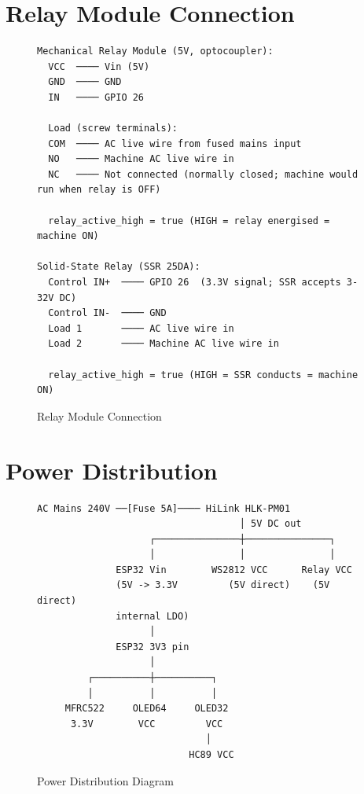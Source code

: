 \section{Relay Module Connection}

\begin{figure}[H]
\centering
\begin{verbatim}
Mechanical Relay Module (5V, optocoupler):
  VCC  ──── Vin (5V)
  GND  ──── GND
  IN   ──── GPIO 26

  Load (screw terminals):
  COM  ──── AC live wire from fused mains input
  NO   ──── Machine AC live wire in
  NC   ──── Not connected (normally closed; machine would run when relay is OFF)

  relay_active_high = true (HIGH = relay energised = machine ON)

Solid-State Relay (SSR 25DA):
  Control IN+  ──── GPIO 26  (3.3V signal; SSR accepts 3-32V DC)
  Control IN-  ──── GND
  Load 1       ──── AC live wire in
  Load 2       ──── Machine AC live wire in

  relay_active_high = true (HIGH = SSR conducts = machine ON)
\end{verbatim}
\caption{Relay Module Connection}
\label{fig:wiring_relay}
\end{figure}

\section{Power Distribution}

\begin{figure}[H]
\centering
\begin{verbatim}
AC Mains 240V ──[Fuse 5A]──── HiLink HLK-PM01
                                    │ 5V DC out
                    ┌───────────────┼───────────────┐
                    │               │               │
              ESP32 Vin        WS2812 VCC      Relay VCC
              (5V -> 3.3V         (5V direct)    (5V direct)
              internal LDO)
                    │
              ESP32 3V3 pin
                    │
         ┌──────────┼──────────┐
         │          │          │
     MFRC522     OLED64     OLED32
      3.3V        VCC         VCC
                              │
                           HC89 VCC
\end{verbatim}
\caption{Power Distribution Diagram}
\label{fig:power}
\end{figure}
